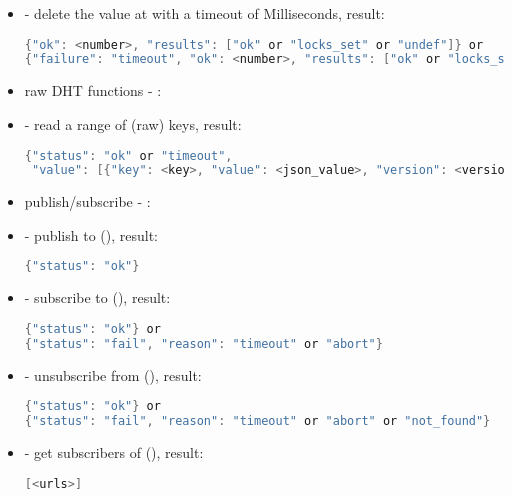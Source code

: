 \begin{itemize}
\begin{lstlisting}[language=java]
\end{lstlisting}
  \item {} - delete the value at  with a timeout of  Milliseconds, result:
\begin{lstlisting}[language=java]
{"ok": <number>, "results": ["ok" or "locks_set" or "undef"]} or
{"failure": "timeout", "ok": <number>, "results": ["ok" or "locks_set" or "undef"]}
\end{lstlisting}
  \item[] \hspace{-1.7em}raw DHT functions - :
  \item {} - read a range of (raw) keys, result:
\begin{lstlisting}[language=java]
{"status": "ok" or "timeout",
 "value": [{"key": <key>, "value": <json_value>, "version": <version>}]}
\end{lstlisting}
  \item[] \hspace{-1.7em}publish/subscribe - :
  \item {} - publish  to  (), result:
\begin{lstlisting}[language=java]
{"status": "ok"}
\end{lstlisting}
  \item {} - subscribe  to  (), result:
\begin{lstlisting}[language=java]
{"status": "ok"} or
{"status": "fail", "reason": "timeout" or "abort"}
\end{lstlisting}
  \item {} - unsubscribe  from  (), result:
\begin{lstlisting}[language=java]
{"status": "ok"} or
{"status": "fail", "reason": "timeout" or "abort" or "not_found"}
\end{lstlisting}
  \item {} - get subscribers of  (), result:
\begin{lstlisting}[language=java]
[<urls>]
\end{lstlisting}

\end{itemize}
